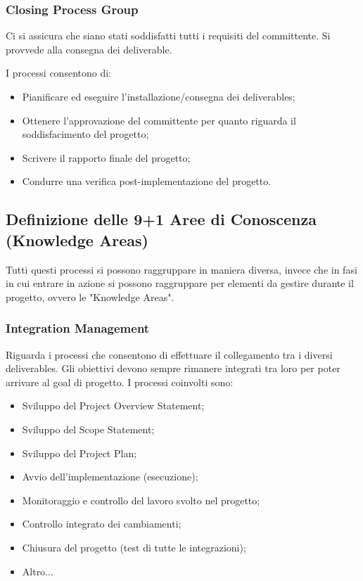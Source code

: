 \subsubsection{Closing Process Group}
\begin{info}
	Ci si assicura che siano stati soddisfatti tutti i requisiti del committente. Si provvede alla consegna dei deliverable.
\end{info}
I processi consentono di:
\begin{itemize}
	\item Pianificare ed eseguire l'installazione/consegna dei deliverables;
	\item Ottenere l'approvazione del committente per quanto riguarda il soddisfacimento del progetto;
	\item Scrivere il rapporto finale del progetto;
	\item Condurre una verifica post-implementazione del progetto.
\end{itemize}
\subsection{Definizione delle 9+1 Aree di Conoscenza (Knowledge Areas)}
Tutti questi processi si possono raggruppare in maniera diversa, invece che in fasi in cui entrare in azione si possono raggruppare per elementi da gestire durante il progetto, ovvero le "Knowledge Areas".
\subsubsection{Integration Management}
Riguarda i processi che consentono di effettuare il collegamento tra i diversi deliverables. Gli obiettivi devono sempre rimanere integrati tra loro per poter arrivare al goal di progetto. I processi coinvolti sono:
\begin{itemize}
	\item Sviluppo del Project Overview Statement;
	\item Sviluppo del Scope Statement;
	\item Sviluppo del Project Plan;
	\item Avvio dell’implementazione (esecuzione);
	\item Monitoraggio e controllo del lavoro svolto nel progetto;
	\item Controllo integrato dei cambiamenti;
	\item Chiusura del progetto (test di tutte le integrazioni);
	\item Altro...
\end{itemize}
